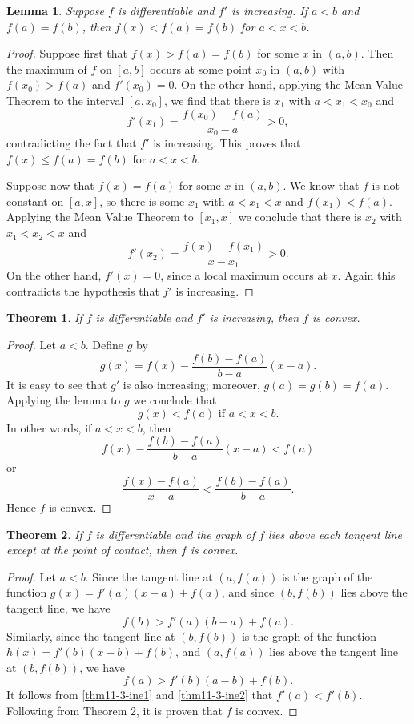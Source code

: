 \documentclass{article}
\numberwithin{corollary}{subsection}
\numberwithin{definition}{subsection}
\numberwithin{lemma}{subsection}
\newtheorem*{lemma*}{Lemma}
\newtheorem{theorem}{Theorem}
\numberwithin{theorem}{subsection}
\begin{document}
\begin{lemma*}
  Suppose $f$ is differentiable and $f'$ is increasing. If $a < b$ and $f(a) =
  f(b)$, then $f(x) < f(a) = f(b)$ for $a < x < b$.
\end{lemma*}
\begin{proof}
  Suppose first that $f(x) > f(a) = f(b)$ for some $x$ in $(a, b)$. Then the
  maximum of $f$ on $[a, b]$ occurs at some point $x_0$ in $(a, b)$ with
  $f(x_0) > f(a)$ and $f'(x_0) = 0$. On the other hand, applying the Mean Value
  Theorem to the interval $[a, x_0]$, we find that there is $x_1$ with $a < x_1
  < x_0$ and \[
    f'(x_1) = \frac{f(x_0) - f(a)}{x_0 - a} > 0,
  \] contradicting the fact that $f'$ is increasing. This proves that $f(x)
  \leq f(a) = f(b)$ for $a < x < b$.

  Suppose now that $f(x) = f(a)$ for some $x$ in $(a, b)$. We know that $f$ is
  not constant on $[a, x]$, so there is some $x_1$ with $a < x_1 < x$ and
  $f(x_1) < f(a)$. Applying the Mean Value Theorem to $[x_1, x]$ we conclude
  that there is $x_2$ with $x_1 < x_2 < x$ and \[
    f'(x_2) = \frac{f(x) - f(x_1)}{x - x_1} > 0.
  \] On the other hand, $f'(x) = 0$, since a local maximum occurs at $x$. Again
  this contradicts the hypothesis that $f'$ is increasing.
\end{proof}

\begin{theorem}
  If $f$ is differentiable and $f'$ is increasing, then $f$ is convex.
\end{theorem}
\begin{proof}
  Let $a < b$. Define $g$ by \[
    g(x) = f(x) - \frac{f(b) - f(a)}{b - a}(x - a).
  \] It is easy to see that $g'$ is also increasing; moreover, $g(a) = g(b) =
  f(a)$. Applying the lemma to $g$ we conclude that \[
    g(x) < f(a) \text{ if } a < x < b.
  \] In other words, if $a < x < b$, then \[
    f(x) - \frac{f(b) - f(a)}{b - a}(x - a) < f(a)
  \] or \[
    \frac{f(x) - f(a)}{x - a} < \frac{f(b) - f(a)}{b - a}.
  \] Hence $f$ is convex.
\end{proof}

\begin{theorem}
  If $f$ is differentiable and the graph of $f$ lies above each tangent line
  except at the point of contact, then $f$ is convex.
\end{theorem}
\begin{proof}
  Let $a < b$. Since the tangent line at $(a, f(a))$ is the graph of the
  function $g(x) = f'(a)(x - a) + f(a)$, and since $(b, f(b))$ lies above the
  tangent line, we have \[
    \label{thm11-3-ine1} \tag{1}
    f(b) > f'(a)(b - a) + f(a).
  \] Similarly, since the tangent line at $(b, f(b))$ is the graph of the
  function $h(x) = f'(b)(x - b) + f(b)$, and $(a, f(a))$ lies above the tangent
  line at $(b, f(b))$, we have \[
    \label{thm11-3-ine2} \tag{2}
    f(a) > f'(b)(a - b) + f(b).
  \] It follows from \eqref{thm11-3-ine1} and \eqref{thm11-3-ine2} that $f'(a)
  < f'(b)$. Following from Theorem 2, it is proven that $f$ is convex.
\end{proof}
\end{document}
